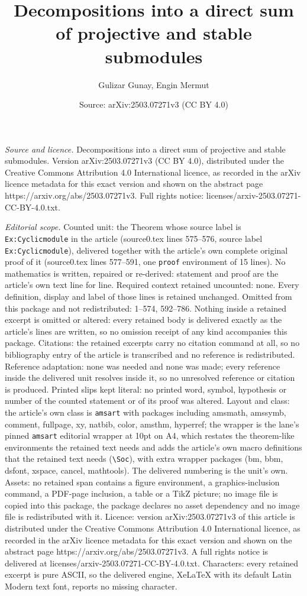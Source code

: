 \documentclass[10pt,a4paper]{amsart}
\title[Decompositions into a direct sum of projective and stable su]{Decompositions into a direct sum of projective and stable submodules}
\author{Gulizar Gunay, Engin Mermut}
\date{Source: arXiv:2503.07271v3 (CC BY 4.0)}
\begin{document}
\maketitle

\noindent\emph{Source and licence.} Decompositions into a direct sum of projective and stable submodules. Version arXiv:2503.07271v3 (CC BY 4.0), distributed under the Creative Commons Attribution 4.0 International licence, as recorded in the arXiv licence metadata for this exact version and shown on the abstract page https://arxiv.org/abs/2503.07271v3. Full rights notice: licenses/arxiv-2503.07271-CC-BY-4.0.txt.\par\smallskip

\noindent\textit{Editorial scope.} Counted unit: the Theorem whose source label is \texttt{Ex:Cyclicmodule} in the article (source0.tex lines 575--576, source label \texttt{Ex:Cyclicmodule}), delivered together with the article's own complete original proof of it (source0.tex lines 577--591, one \texttt{proof} environment of 15 lines). No mathematics is written, repaired or re-derived: statement and proof are the article's own text line for line. Required context retained uncounted: none. Every definition, display and label of those lines is retained unchanged. Omitted from this package and not redistributed: 1--574, 592--786. Nothing inside a retained excerpt is omitted or altered: every retained body is delivered exactly as the article's lines are written, so no omission receipt of any kind accompanies this package. Citations: the retained excerpts carry no citation command at all, so no bibliography entry of the article is transcribed and no reference is redistributed. Reference adaptation: none was needed and none was made; every reference inside the delivered unit resolves inside it, so no unresolved reference or citation is produced. Printed slips kept literal: no printed word, symbol, hypothesis or number of the counted statement or of its proof was altered. Layout and class: the article's own class is \texttt{amsart} with packages including amsmath, amssymb, comment, fullpage, xy, natbib, color, amsthm, hyperref; the wrapper is the lane's pinned \texttt{amsart} editorial wrapper at 10pt on A4, which restates the theorem-like environments the retained text needs and adds the article's own macro definitions that the retained text needs (\texttt{\textbackslash Soc}), with extra wrapper packages (bm, bbm, dsfont, xspace, cancel, mathtools). The delivered numbering is the unit's own. Assets: no retained span contains a figure environment, a graphics-inclusion command, a PDF-page inclusion, a table or a TikZ picture; no image file is copied into this package, the package declares no asset dependency and no image file is redistributed with it. Licence: version arXiv:2503.07271v3 of this article is distributed under the Creative Commons Attribution 4.0 International licence, as recorded in the arXiv licence metadata for this exact version and shown on the abstract page https://arxiv.org/abs/2503.07271v3. A full rights notice is delivered at licenses/arxiv-2503.07271-CC-BY-4.0.txt. Characters: every retained excerpt is pure ASCII, so the delivered engine, XeLaTeX with its default Latin Modern text font, reports no missing character.
\end{document}
